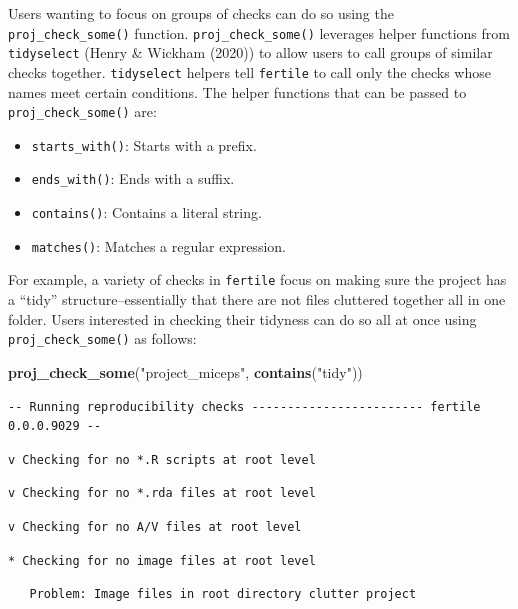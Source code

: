 \documentclass[12pt,twoside]{reedthesis}
\newenvironment{Shaded}{\begin{snugshade}}{\end{snugshade}}
\newcommand{\KeywordTok}[1]{\textcolor[rgb]{0.13,0.29,0.53}{\textbf{#1}}}
\newcommand{\StringTok}[1]{\textcolor[rgb]{0.31,0.60,0.02}{#1}}
\newcommand{\NormalTok}[1]{#1}
\providecommand{\tightlist}{%
  \setlength{\itemsep}{0pt}\setlength{\parskip}{0pt}}
\begin{document}
Users wanting to focus on groups of checks can do so using the
\texttt{proj\_check\_some()} function. \texttt{proj\_check\_some()}
leverages helper functions from \texttt{tidyselect} (Henry \& Wickham
(2020)) to allow users to call groups of similar checks together.
\texttt{tidyselect} helpers tell \texttt{fertile} to call only the
checks whose names meet certain conditions. The helper functions that
can be passed to \texttt{proj\_check\_some()} are:
\begin{itemize}
\tightlist
\item
  \texttt{starts\_with()}: Starts with a prefix.
\item
  \texttt{ends\_with()}: Ends with a suffix.
\item
  \texttt{contains()}: Contains a literal string.
\item
  \texttt{matches()}: Matches a regular expression.
\end{itemize}
For example, a variety of checks in \texttt{fertile} focus on making
sure the project has a ``tidy'' structure--essentially that there are
not files cluttered together all in one folder. Users interested in
checking their tidyness can do so all at once using
\texttt{proj\_check\_some()} as follows:
\begin{Shaded}
\begin{Highlighting}[]
\KeywordTok{proj_check_some}\NormalTok{(}\StringTok{"project_miceps"}\NormalTok{, }\KeywordTok{contains}\NormalTok{(}\StringTok{"tidy"}\NormalTok{))}
\end{Highlighting}
\end{Shaded}
\begin{verbatim}
-- Running reproducibility checks ------------------------ fertile 0.0.0.9029 --
\end{verbatim}
\begin{verbatim}
v Checking for no *.R scripts at root level
\end{verbatim}
\begin{verbatim}
v Checking for no *.rda files at root level
\end{verbatim}
\begin{verbatim}
v Checking for no A/V files at root level
\end{verbatim}
\begin{verbatim}
* Checking for no image files at root level
\end{verbatim}
\begin{verbatim}
   Problem: Image files in root directory clutter project
\end{verbatim}
\end{document}
